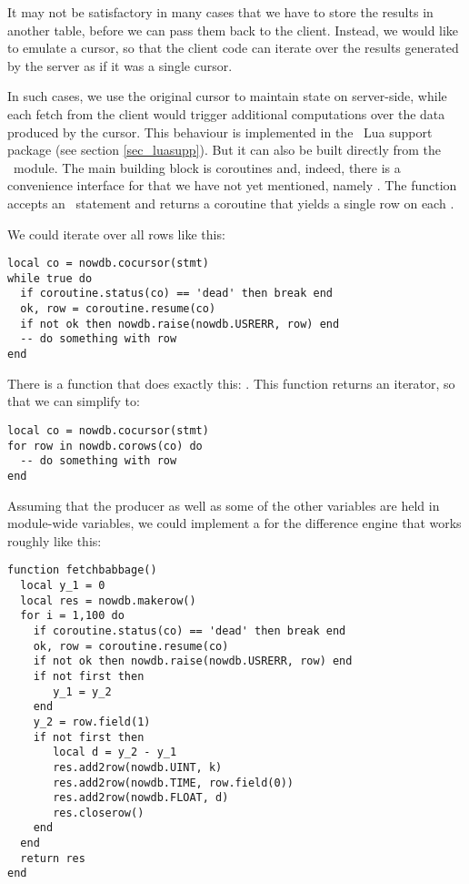 It may not be satisfactory in many cases
that we have to store the results in another table,
before we can pass them back to the client.
Instead, we would like to emulate a cursor, so that
the client code can iterate over the results
generated by the server as if it was a single cursor.

In such cases, we use the original cursor
to maintain state on server-side,
while each fetch from the client would trigger
additional computations over the data produced
by the cursor. This behaviour is implemented
in the \nowdb\ Lua support package (see section
\ref{sec_luasupp}). But it can also be built
directly from the \nowdb\ module.
The main building block is coroutines and,
indeed, there is a convenience interface
for  that we have not yet mentioned,
namely .
The function accepts an \sql\ statement and
returns a coroutine that yields a single row
on each .

We could iterate over all rows like this:

\begin{lua}
\begin{lstlisting}
local co = nowdb.cocursor(stmt)
while true do
  if coroutine.status(co) == 'dead' then break end
  ok, row = coroutine.resume(co)
  if not ok then nowdb.raise(nowdb.USRERR, row) end
  -- do something with row
end
\end{lstlisting}
\end{lua}

There is a function that does exactly this:
. This function returns
an iterator, so that we can simplify to:

\begin{lua}
\begin{lstlisting}
local co = nowdb.cocursor(stmt)
for row in nowdb.corows(co) do
  -- do something with row
end
\end{lstlisting}
\end{lua}

Assuming that the producer as well as some of the other variables
are held in module-wide variables,
we could implement a  for the difference engine
that works roughly like this:

\begin{lua}
\begin{lstlisting}
function fetchbabbage()
  local y_1 = 0
  local res = nowdb.makerow()
  for i = 1,100 do
    if coroutine.status(co) == 'dead' then break end
    ok, row = coroutine.resume(co)
    if not ok then nowdb.raise(nowdb.USRERR, row) end
    if not first then
       y_1 = y_2
    end
    y_2 = row.field(1)
    if not first then
       local d = y_2 - y_1
       res.add2row(nowdb.UINT, k)
       res.add2row(nowdb.TIME, row.field(0))
       res.add2row(nowdb.FLOAT, d)
       res.closerow()
    end
  end
  return res
end
\end{lstlisting}
\end{lua}

